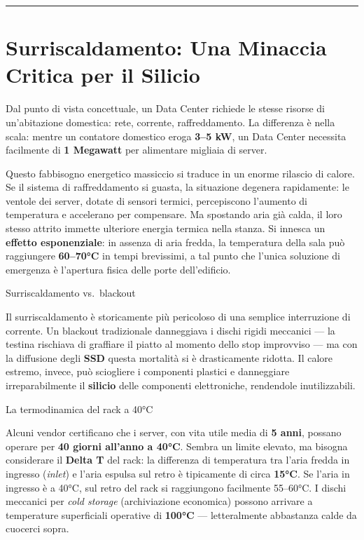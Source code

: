 \documentclass[
  italian,
  openany]{book}
\begin{document}
\begin{center}\rule{0.5\linewidth}{0.5pt}\end{center}

\section{Surriscaldamento: Una Minaccia Critica per il
Silicio}\label{surriscaldamento-una-minaccia-critica-per-il-silicio}

Dal punto di vista concettuale, un Data Center richiede le stesse
risorse di un'abitazione domestica: rete, corrente, raffreddamento. La
differenza è nella scala: mentre un contatore domestico eroga
\textbf{3--5 kW}, un Data Center necessita facilmente di \textbf{1
Megawatt} per alimentare migliaia di server.

Questo fabbisogno energetico massiccio si traduce in un enorme rilascio
di calore. Se il sistema di raffreddamento si guasta, la situazione
degenera rapidamente: le ventole dei server, dotate di sensori termici,
percepiscono l'aumento di temperatura e accelerano per compensare. Ma
spostando aria già calda, il loro stesso attrito immette ulteriore
energia termica nella stanza. Si innesca un \textbf{effetto
esponenziale}: in assenza di aria fredda, la temperatura della sala può
raggiungere \textbf{60--70°C} in tempi brevissimi, a tal punto che
l'unica soluzione di emergenza è l'apertura fisica delle porte
dell'edificio.

\begin{calloutwarning}{Surriscaldamento vs. blackout}

Il surriscaldamento è storicamente più pericoloso di una semplice
interruzione di corrente. Un blackout tradizionale danneggiava i dischi
rigidi meccanici --- la testina rischiava di graffiare il piatto al
momento dello stop improvviso --- ma con la diffusione degli
\textbf{SSD} questa mortalità si è drasticamente ridotta. Il calore
estremo, invece, può sciogliere i componenti plastici e danneggiare
irreparabilmente il \textbf{silicio} delle componenti elettroniche,
rendendole inutilizzabili.

\end{calloutwarning}

\begin{callouttip}{La termodinamica del rack a 40°C}

Alcuni vendor certificano che i server, con vita utile media di
\textbf{5 anni}, possano operare per \textbf{40 giorni all'anno a 40°C}.
Sembra un limite elevato, ma bisogna considerare il \textbf{Delta T} del
rack: la differenza di temperatura tra l'aria fredda in ingresso
(\emph{inlet}) e l'aria espulsa sul retro è tipicamente di circa
\textbf{15°C}. Se l'aria in ingresso è a 40°C, sul retro del rack si
raggiungono facilmente 55--60°C. I dischi meccanici per \emph{cold
storage} (archiviazione economica) possono arrivare a temperature
superficiali operative di \textbf{100°C} --- letteralmente abbastanza
calde da cuocerci sopra.

\end{callouttip}
\end{document}
